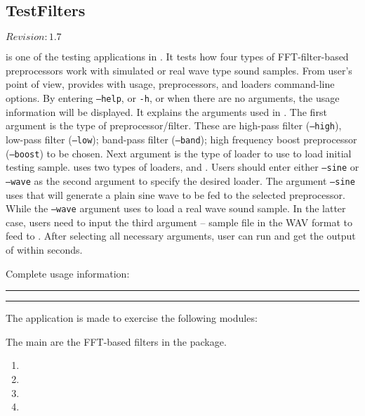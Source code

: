 \subsection{TestFilters}

$Revision: 1.7 $

 is one of the testing applications in {\marf}. It tests how four types of
FFT-filter-based preprocessors work with simulated or real wave type sound samples.
From user's point of view,  provides with usage, preprocessors, and loaders
command-line options.
By entering \texttt{--help}, or \texttt{-h}, or
when there are no arguments, the usage information will be displayed.
It explains the arguments used in . The first argument is the type of
preprocessor/filter. These are high-pass filter (\texttt{--high}), low-pass filter (\texttt{--low});
band-pass filter (\texttt{--band}); high frequency boost preprocessor (\texttt{--boost})
to be chosen. Next argument is the type of loader to use to load initial testing sample.
 uses two types of
loaders,  and .
Users should enter either \texttt{--sine} or \texttt{--wave} as the second argument
to specify the desired loader. The argument \texttt{--sine} uses 
that will generate a plain sine wave to be fed to the selected preprocessor.
While the \texttt{--wave} argument uses  to load a
real wave sound sample. In the latter case, users need to input the third argument --
sample file in the WAV format to feed to
. After selecting all necessary arguments, user can run and get the output of
 within seconds.

\noindent
Complete usage information:

\vspace{15pt}
\hrule

\hrule
\vspace{15pt}

The application is made to exercise the following {\marf} modules:

The main are the FFT-based filters in the
 package.

\begin{enumerate}
\item
{}
\item
{}
\item
{}
\item
{}
\end{enumerate}

